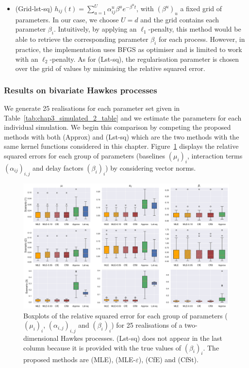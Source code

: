 \begin{enumerate}
\begin{itemize}
        \item (Grid-lst-sq) $h_{ij}(t) = \sum_{u=1}^{U}{\alpha_{ij}^u\beta^u e^{-\beta^u t}}$, with $(\beta^u)_u$ a fixed grid of parameters. In our case, we choose $U=d$ and the grid contains each parameter $\beta_{i}$. Intuitively, by applying an $\ell_1$-penalty, this method would be able to retrieve the corresponding parameter $\beta_{i}$ for each process.
        However, in practice, the implementation uses BFGS as optimiser and is limited to work with an $\ell_2$-penalty. As for (Lst-sq), the regularisation parameter is chosen over the grid of values by minimising the relative squared error.
    \end{itemize}
    \end{enumerate}


    \subsubsection{Results on bivariate Hawkes processes}\label{sec:chap3_dim2}

   We generate 25 realisations for each parameter set given in Table~\ref{tab:chap3_simulated_2_table} and we estimate the parameters for each individual simulation.  We begin this comparison by competing the proposed methods with both (Approx) and (Lst-sq) which are the two methods with the same kernel functions considered in this chapter. Figure~\ref{fig:chap3_boxplots} displays the relative squared errors for each group of parameters (baselines $(\mu_i)_i$, interaction terms $(\alpha_{ij})_{i,j}$ and delay factors $(\beta_i)_i$)  by considering vector norms.
    
    {\begin{figure}[!ht]
    \centering
    \includegraphics[width=0.9\linewidth]{images/chapter3/boxplots2O.pdf}
    \caption{Boxplots of the relative squared error for each group of parameters ($(\mu_i)_i$, $(\alpha_{i,j})_{i,j}$ and $(\beta_i)_i$) for 25 realisations of a two-dimensional Hawkes processes.
    (Lst-sq) does not appear in the last column because it is provided with the true values of \((\beta_i)_i\).
    The proposed methods are (MLE), (MLE-$\varepsilon$), (CfE) and (CfSt).}
    \label{fig:chap3_boxplots}
    \end{figure}}
    
